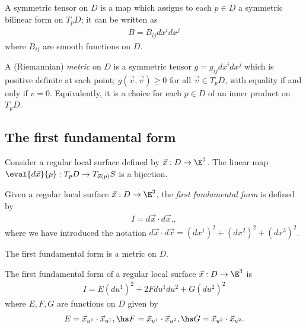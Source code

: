 \documentclass{article}
\begin{document}
\begin{definition}
    A symmetric tensor on $D$ is a map which assigns to each $p\in D$ a symmetric
    bilinear form on $T_pD$; it can be written as
    \begin{align*}
        B=B_{ij}dx^idx^j
    \end{align*}
    where $B_{ij}$ are smooth functions on $D$.
\end{definition}

\begin{definition}
    A (Riemannian) \emph{metric} on $D$ is a symmetric tensor $g=g_{ij}dx^idx^j$ 
    which is positive definite at each point; $g(\vec v,\vec v)\geq 0$ for all
    $\vec v \in T_pD$, with equality if and only if $v=0$. Equivalently, it is a 
    choice for each $p\in D$ of an inner product on $T_pD$.
\end{definition}

\subsection{The first fundamental form}

\begin{proposition}
    Consider a regular local surface defined by $\vec x: D\to \E^3$. The linear map
    $\eval{d\vec x}{p}:T_pD\to T_{\vec x(p)}S$ is a bijection.
\end{proposition}

\begin{definition}
    Given a regular local surface $\vec x: D\to\E^3$, the \emph{first fundamental form}
    is defined by 
    \begin{align*}
        I = d\vec x \cdot d\vec x.,
    \end{align*}
    where we have introduced the notation $d\vec x\cdot d\vec x=(dx^1)^2+(dx^2)^2+(dx^3)^2$.
\end{definition}

\begin{proposition}
    The first fundamental form is a metric on $D$.
\end{proposition}

\begin{proposition}
    The first fundamental form of a regular local surface $\vec x:D\to\E^3$ is
    \begin{align*}
        I = E(du^1)^2 + 2Fdu^1du^2+ G(du^2)^2
    \end{align*}
    where $E,F,G$ are functions on $D$ given by
    \begin{align*}
        E=\vec x_{u^1} \cdot \vec x_{u^1},\hs 
        F=\vec x_{u^1} \cdot \vec x_{u^2},\hs 
        G=\vec x_{u^2} \cdot \vec x_{u^2}.
    \end{align*}
\end{proposition}
\end{document}
